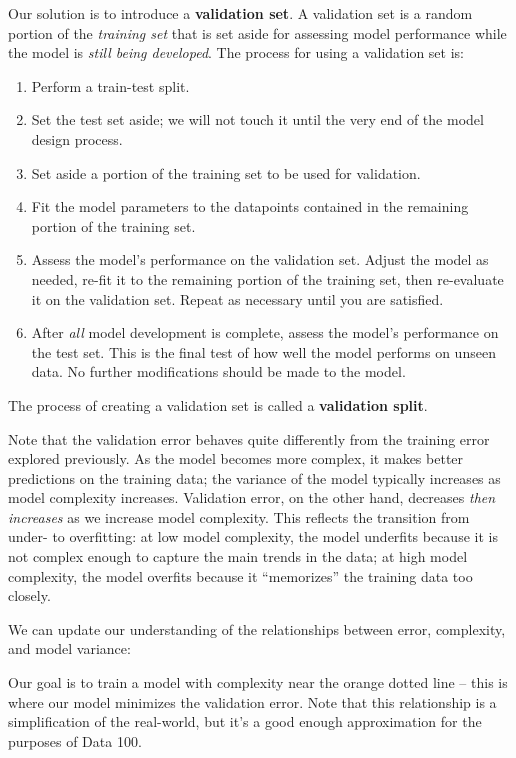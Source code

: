 \documentclass[
  letterpaper,
  DIV=11,
  numbers=noendperiod]{scrreprt}
\providecommand{\tightlist}{%
  \setlength{\itemsep}{0pt}\setlength{\parskip}{0pt}}\usepackage{longtable,booktabs,array}
\begin{document}
Our solution is to introduce a \textbf{validation set}. A validation set
is a random portion of the \emph{training set} that is set aside for
assessing model performance while the model is \emph{still being
developed}. The process for using a validation set is:

\begin{enumerate}
\def\labelenumi{\arabic{enumi}.}
\tightlist
\item
  Perform a train-test split.
\item
  Set the test set aside; we will not touch it until the very end of the
  model design process.
\item
  Set aside a portion of the training set to be used for validation.
\item
  Fit the model parameters to the datapoints contained in the remaining
  portion of the training set.
\item
  Assess the model's performance on the validation set. Adjust the model
  as needed, re-fit it to the remaining portion of the training set,
  then re-evaluate it on the validation set. Repeat as necessary until
  you are satisfied.
\item
  After \emph{all} model development is complete, assess the model's
  performance on the test set. This is the final test of how well the
  model performs on unseen data. No further modifications should be made
  to the model.
\end{enumerate}

The process of creating a validation set is called a \textbf{validation
split}.

Note that the validation error behaves quite differently from the
training error explored previously. As the model becomes more complex,
it makes better predictions on the training data; the variance of the
model typically increases as model complexity increases. Validation
error, on the other hand, decreases \emph{then increases} as we increase
model complexity. This reflects the transition from under- to
overfitting: at low model complexity, the model underfits because it is
not complex enough to capture the main trends in the data; at high model
complexity, the model overfits because it ``memorizes'' the training
data too closely.

We can update our understanding of the relationships between error,
complexity, and model variance:

Our goal is to train a model with complexity near the orange dotted line
-- this is where our model minimizes the validation error. Note that
this relationship is a simplification of the real-world, but it's a good
enough approximation for the purposes of Data 100.
\end{document}
